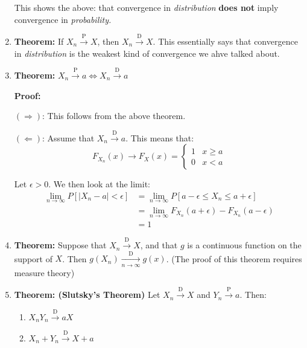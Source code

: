 \documentclass{article}
\begin{document}
\begin{enumerate}
    This shows the above: that convergence in \textit{distribution} \textbf{does not} imply convergence in \textit{probability.}
    
    \item \textbf{Theorem: }If $X_n \xrightarrow{\text{P}} X$, then $X_n \xrightarrow{\text{D}} X$. This essentially says that convergence in \textit{distribution} is the weakest kind of convergence we ahve talked about.
    
    \item \textbf{Theorem:} $X_n \xrightarrow{\text{P}} a \iff X_n \xrightarrow{\text{D}} a$
    
    \textbf{Proof:} 
    
    $(\Rightarrow)$: This follows from the above theorem. 
    
    $(\Leftarrow)$: Assume that $X_n \xrightarrow{\text{D}} a$. This means that:
    \begin{equation*}
        F_{X_n}(x) \rightarrow F_X(x) = \begin{cases}
            1 & x \geq a\\
            0 & x < a
        \end{cases}
    \end{equation*}
    
    Let $\epsilon>0$. We then look at the limit:
    \begin{equation*}
    \begin{split}
        \lim_{n\to\infty} P\left[|X_n - a| < \epsilon \right] &=\lim_{n\to\infty} P\left[a-\epsilon \leq X_n \leq a + \epsilon \right]\\
        &=\lim_{n\to\infty} F_{X_n}(a+\epsilon) - F_{X_n}(a-\epsilon)\\
        &= 1
    \end{split}
    \end{equation*}
    
    \item \textbf{Theorem:} Suppose that $X_n \xrightarrow{\text{D}} X$, and that $g$ is a continuous function on the support of $X$. Then $g\left(X_n\right) \xrightarrow[n \to \infty]{\text{D}} g(x)$. (The proof of this theorem requires measure theory)
    
    \item \textbf{Theorem: (Slutsky's Theorem)} Let $X_n \xrightarrow{\text{D}} X$ and $Y_n \xrightarrow{\text{P}} a$. Then:
    \begin{enumerate}
        \item $X_n Y_n \xrightarrow{\text{D}} aX$
        \item $X_n + Y_n \xrightarrow{\text{D}} X + a$
    \end{enumerate}
    

\end{enumerate}
\end{document}
